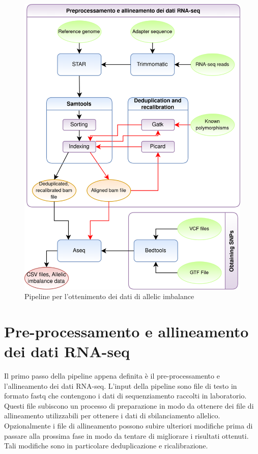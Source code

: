   \begin{figure}[H]
    \centering
    \includegraphics[scale=0.2]{pipeline.png}
    \caption{Pipeline per l'ottenimento dei dati di allelic imbalance}
    \label{fig:proj_pipeline}
  \end{figure}

  \section{Pre-processamento e allineamento dei dati RNA-seq}
  \label{sec:pre_all_rna_seq}
  Il primo passo della pipeline appena definita \`e il pre-processamento e l'allineamento dei dati RNA-seq.
  L'input della pipeline sono file di testo in formato fastq che contengono i dati di sequenziamento raccolti in laboratorio. 
  Questi file subiscono un processo di preparazione in modo da ottenere dei file di allineamento utilizzabili per ottenere i dati di sbilanciamento allelico.
  Opzionalmente i file di allineamento possono subire ulteriori modifiche prima di passare alla prossima fase in modo da tentare di migliorare i risultati ottenuti.
  Tali modifiche sono in particolare deduplicazione e ricalibrazione.

